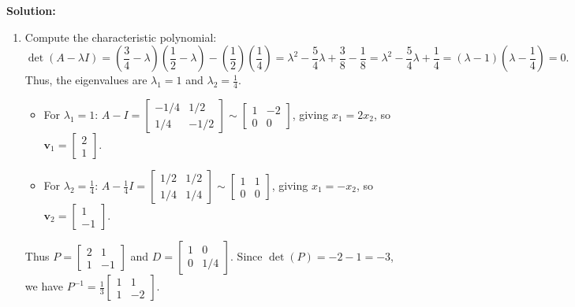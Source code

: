 \documentclass[11pt, letterpaper]{article}
\theoremstyle{definition}
\theoremstyle{remark}
\begin{document}
\textbf{Solution:}
\begin{enumerate}[label=(\alph*)]
    \item Compute the characteristic polynomial:
    \[
    \det(A - \lambda I) = \left(\frac{3}{4} - \lambda\right)\left(\frac{1}{2} - \lambda\right) - \left(\frac{1}{2}\right)\left(\frac{1}{4}\right) = \lambda^{2} - \frac{5}{4}\lambda + \frac{3}{8} - \frac{1}{8} = \lambda^{2} - \frac{5}{4}\lambda + \frac{1}{4} = (\lambda - 1)\left(\lambda - \frac{1}{4}\right) = 0.
    \]
    Thus, the eigenvalues are $\lambda_{1} = 1$ and $\lambda_{2} = \frac{1}{4}$.
    \begin{itemize}
        \item For $\lambda_{1} = 1$: $A - I = \begin{bmatrix} -1/4 & 1/2 \\ 1/4 & -1/2 \end{bmatrix} \sim \begin{bmatrix} 1 & -2 \\ 0 & 0 \end{bmatrix}$, giving $x_{1} = 2x_{2}$, so $\mathbf{v}_{1} = \begin{bmatrix} 2 \\ 1 \end{bmatrix}$.
        \item For $\lambda_{2} = \frac{1}{4}$: $A - \frac{1}{4}I = \begin{bmatrix} 1/2 & 1/2 \\ 1/4 & 1/4 \end{bmatrix} \sim \begin{bmatrix} 1 & 1 \\ 0 & 0 \end{bmatrix}$, giving $x_{1} = -x_{2}$, so $\mathbf{v}_{2} = \begin{bmatrix} 1 \\ -1 \end{bmatrix}$.
    \end{itemize}
    Thus $P = \begin{bmatrix} 2 & 1 \\ 1 & -1 \end{bmatrix}$ and $D = \begin{bmatrix} 1 & 0 \\ 0 & 1/4 \end{bmatrix}$. Since $\det(P) = -2 - 1 = -3$, we have $P^{-1} = \frac{1}{3}\begin{bmatrix} 1 & 1 \\ 1 & -2 \end{bmatrix}$.


\end{enumerate}
\end{document}

